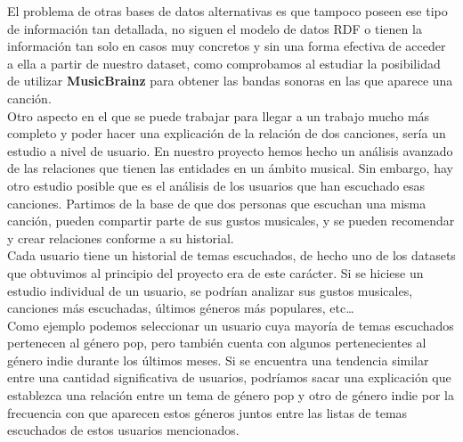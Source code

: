 El problema de otras bases de datos alternativas es que tampoco poseen ese tipo de información tan detallada, no siguen el modelo de datos RDF o tienen la información tan solo en casos muy concretos y sin una forma efectiva de acceder a ella a partir de nuestro dataset, como comprobamos al estudiar la posibilidad de utilizar \textbf{MusicBrainz} \cite{musicbrainz} para obtener las bandas sonoras en las que aparece una canción.\\

Otro aspecto en el que se puede trabajar para llegar a un trabajo mucho más completo y poder hacer una explicación de la relación de dos canciones, sería un estudio a nivel de usuario.
En nuestro proyecto hemos hecho un análisis avanzado de las relaciones que tienen las entidades en un ámbito musical. Sin embargo, hay otro estudio posible que es el análisis de los usuarios que han escuchado esas canciones. Partimos de la base de que dos personas que escuchan una misma canción, pueden compartir parte de sus gustos musicales, y se pueden recomendar y crear relaciones conforme a su historial.\\

Cada usuario tiene un historial de temas escuchados, de hecho uno de los datasets que obtuvimos al principio del proyecto era de este carácter. Si se hiciese un estudio individual de un usuario, se podrían analizar sus gustos musicales, canciones más escuchadas, últimos géneros más populares, etc…\\

Como ejemplo podemos seleccionar un usuario cuya mayoría de temas escuchados pertenecen al género pop, pero también cuenta con algunos pertenecientes al género indie durante los últimos meses. Si se encuentra una tendencia similar entre una cantidad significativa de usuarios, podríamos sacar una explicación que establezca una relación entre un tema de género pop y otro de género indie por la frecuencia con que aparecen estos géneros juntos entre las listas de temas escuchados de estos usuarios mencionados.\\
